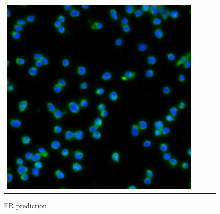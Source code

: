 \begin{figure}[H]
\begin{tabularx}{\textwidth}{YYYY}
            \includegraphics{bilder/ER/gt_nuclei.jpg}
        \end{tabularx}
    \caption{ER prediction}
\end{figure}
